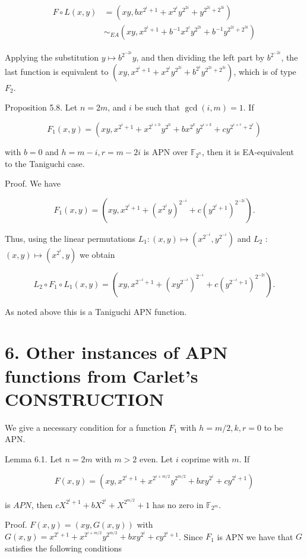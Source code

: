 \documentclass[10pt]{article}
\begin{document}
$$
\begin{aligned}
F \circ L(x, y) & =\left(x y, b x^{2^{i}+1}+x^{2^{i}} y^{2^{2 i}}+y^{2^{2 i}+2^{3 i}}\right) \\
& \sim_{E A}\left(x y, x^{2^{i}+1}+b^{-1} x^{2^{i}} y^{2^{2 i}}+b^{-1} y^{2^{2 i}+2^{3 i}}\right)
\end{aligned}
$$

Applying the substitution $y \mapsto b^{2^{-2 i}} y$, and then dividing the left part by $b^{2^{-2 i}}$, the last function is equivalent to $\left(x y, x^{2^{i}+1}+x^{2^{i}} y^{2^{2 i}}+b^{2^{i}} y^{2^{2 i}+2^{3 i}}\right)$, which is of type $F_{2}$.

Proposition 5.8. Let $n=2 m$, and $i$ be such that $\operatorname{gcd}(i, m)=1$. If

$$
F_{1}(x, y)=\left(x y, x^{2^{i}+1}+x^{2^{i+h}} y^{2^{h}}+b x^{2^{k}} y^{2^{i+k}}+c y^{2^{i+r}+2^{r}}\right)
$$

with $b=0$ and $h=m-i, r=m-2 i$ is APN over $\mathbb{F}_{2^{n}}$, then it is EA-equivalent to the Taniguchi case.

Proof. We have

$$
F_{1}(x, y)=\left(x y, x^{2^{i}+1}+\left(x^{2^{i}} y\right)^{2^{-i}}+c\left(y^{2^{i}+1}\right)^{2^{-2 i}}\right) .
$$

Thus, using the linear permutations $L_{1}:(x, y) \mapsto\left(x^{2^{-i}}, y^{2^{-i}}\right)$ and $L_{2}$ : $(x, y) \mapsto\left(x^{2^{i}}, y\right)$ we obtain

$$
L_{2} \circ F_{1} \circ L_{1}(x, y)=\left(x y, x^{2^{-i}+1}+\left(x y^{2^{-i}}\right)^{2^{-i}}+c\left(y^{2^{-i}+1}\right)^{2^{-2 i}}\right) .
$$

As noted above this is a Taniguchi APN function.

\section*{6. Other instances of APN functions from Carlet's CONSTRUCTION}
We give a necessary condition for a function $F_{1}$ with $h=m / 2, k, r=0$ to be APN.

Lemma 6.1. Let $n=2 m$ with $m>2$ even. Let $i$ coprime with $m$. If

$$
F(x, y)=\left(x y, x^{2^{i}+1}+x^{2^{i+m / 2}} y^{2^{m / 2}}+b x y^{2^{i}}+c y^{2^{i}+1}\right)
$$

is $A P N$, then $c X^{2^{i}+1}+b X^{2^{i}}+X^{2^{m / 2}}+1$ has no zero in $\mathbb{F}_{2^{m}}$.

Proof. $F(x, y)=(x y, G(x, y))$ with $G(x, y)=x^{2^{i}+1}+x^{2^{i+m / 2}} y^{2^{m / 2}}+ b x y^{2^{i}}+c y^{2^{i}+1}$. Since $F_{1}$ is APN we have that $G$ satisfies the following conditions
\end{document}

